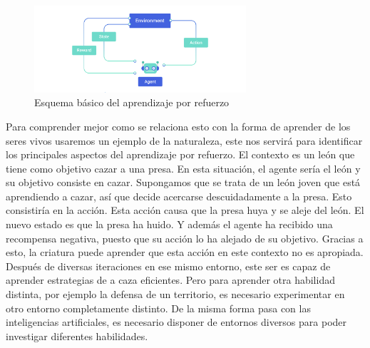 \begin{figure}[h]
	\centering
	\includegraphics[width=0.7\textwidth]{img/esquema_RL.jpg}
	\caption{Esquema básico del aprendizaje por refuerzo \cite {RL_esquema}}
	\label{fig:esquema_RL}
\end{figure}

Para comprender mejor como se relaciona esto con la forma de aprender de los seres vivos usaremos un ejemplo de la naturaleza, este nos servirá para identificar los principales aspectos del aprendizaje por refuerzo. El contexto es un león que tiene como objetivo cazar a una presa. En esta situación, el agente sería el león y su objetivo consiste en cazar. Supongamos que se trata de un león joven que está aprendiendo a cazar, así que decide acercarse descuidadamente a la presa. Esto consistiría en la acción. Esta acción causa que la presa huya y se aleje del león. El nuevo estado es que la presa ha huido. Y además el agente ha recibido una recompensa negativa, puesto que su acción lo ha alejado de su objetivo. Gracias a esto, la criatura puede aprender que esta acción en este contexto no es apropiada. Después de diversas iteraciones en ese mismo entorno, este ser es capaz de aprender estrategias de a caza eficientes. Pero para aprender otra habilidad distinta, por ejemplo la defensa de un territorio, es necesario experimentar en otro entorno completamente distinto. De la misma forma pasa con las inteligencias artificiales, es necesario disponer de entornos diversos para poder investigar diferentes habilidades.  

